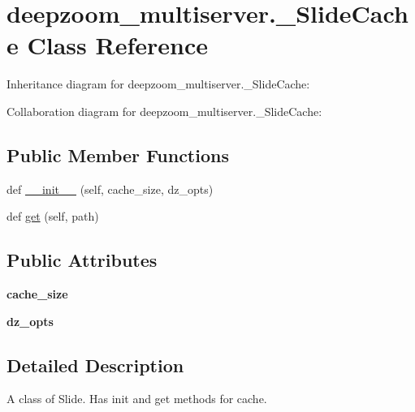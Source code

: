 \hypertarget{classdeepzoom__multiserver_1_1__SlideCache}{}\section{deepzoom\+\_\+multiserver.\+\_\+\+Slide\+Cache Class Reference}
\label{classdeepzoom__multiserver_1_1__SlideCache}


Inheritance diagram for deepzoom\+\_\+multiserver.\+\_\+\+Slide\+Cache\+:


Collaboration diagram for deepzoom\+\_\+multiserver.\+\_\+\+Slide\+Cache\+:
\subsection*{Public Member Functions}
\begin{DoxyCompactItemize}
\item 
def \hyperlink{classdeepzoom__multiserver_1_1__SlideCache_aff4273bc9e83c44f06410582a494fd09}{\+\_\+\+\_\+init\+\_\+\+\_\+} (self, cache\+\_\+size, dz\+\_\+opts)
\item 
def \hyperlink{classdeepzoom__multiserver_1_1__SlideCache_a56ebc4b35c7ec1e9e39ee2e0c368cc56}{get} (self, path)
\end{DoxyCompactItemize}
\subsection*{Public Attributes}
\begin{DoxyCompactItemize}
\item 
\mbox{\label{classdeepzoom__multiserver_1_1__SlideCache_a22ffbd7a94f22b0464a0db29ed45028f}} 
{\bfseries cache\+\_\+size}
\item 
\mbox{\label{classdeepzoom__multiserver_1_1__SlideCache_a462ac9559c684865fd82ce67c5f31219}} 
{\bfseries dz\+\_\+opts}
\end{DoxyCompactItemize}


\subsection{Detailed Description}
\begin{DoxyVerb}A class of Slide. Has init and get methods for cache.
\end{DoxyVerb}
 

